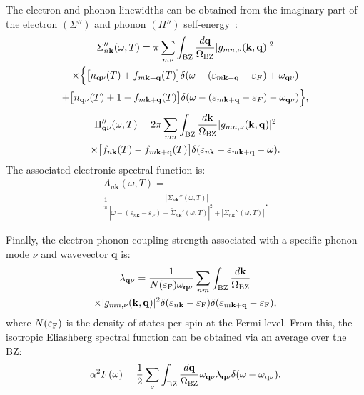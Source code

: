 \documentclass[final,3p,times,twocolumn]{elsarticle}
\begin{document}
The electron and phonon linewidths can be obtained from the imaginary part of the electron $(\Sigma'')$ and phonon $(\Pi'')$ self-energy~\cite{Giustino2007}:
\begin{multline}\label{linewidthel}
   \Sigma_{n\mathbf{k}}''(\omega,T) = \pi \sum_{m\nu} \int_{\rm BZ} \frac{d\mathbf{q}}{\Omega_{\rm BZ}} | g_{mn,\nu}(\mathbf{k,q}) |^2 \\
    \times \Big\{\big[n_{\mathbf{q}\nu}(T)+f_{m\mathbf{k+q}}(T)\big]\delta(\omega - (\varepsilon_{m\mathbf{k+q}}-\varepsilon_F) +\omega_{\mathbf{q}\nu})\\
+ \big[n_{\mathbf{q}\nu}(T)+1-f_{m\mathbf{k+q}}(T)\big]\delta(\omega - (\varepsilon_{m\mathbf{k+q}}-\varepsilon_F) - \omega_{\mathbf{q}\nu})\Big\}, 
\end{multline}                                        
\begin{multline}\label{linewidthph}
\Pi_{\mathbf{q}\nu}''(\omega,T) = 2\pi \sum_{mn} \int_{\rm BZ} \frac{d\mathbf{k}}{\Omega_{\rm BZ}} | g_{mn,\nu}(\mathbf{k,q}) |^2 \\
\times \big[f_{n\mathbf{k}}(T)-f_{m\mathbf{k+q}}(T)\big]\delta(\varepsilon_{n\mathbf{k}} - \varepsilon_{m\mathbf{k+q}} -\omega).
\end{multline}         
The associated electronic spectral function is:  
\begin{multline}\label{spectral_funct}
   A_{n\mathbf{k}}(\omega,T) =\\
    \frac{1}{\pi} \frac{| \Sigma_{n\mathbf{k}}''(\omega,T)|}{|\omega - (\varepsilon_{n\mathbf{k}}-\varepsilon_F)- \tilde{\Sigma}_{n\mathbf{k}}'(\omega,T)|^2 + | \Sigma_{n\mathbf{k}}''(\omega,T)|}.
\end{multline}
       
Finally, the electron-phonon coupling strength associated with a specific phonon mode $\nu$ and wavevector $\mathbf{q}$ is:
\begin{multline}\label{lambdaEQ}
\lambda_{\mathbf{q}\nu} = \frac{1}{N(\varepsilon_{\rm F}) \omega_{\mathbf{q}\nu}} 
\sum_{nm} \int_{\rm BZ} \frac{d\mathbf{k}}{\Omega_{\rm BZ}} \\
 \times |g_{mn,\nu}(\mathbf{k,q})|^2  \delta(\varepsilon_{n\mathbf{k}}-\varepsilon_{\rm F}) \delta(\varepsilon_{m\mathbf{k+q}}-\varepsilon_{\rm F}),
\end{multline}
where $N(\varepsilon_{\rm F})$ is the density of states per spin at the Fermi level.
From this, the isotropic Eliashberg spectral function can be obtained via an average over the BZ:
\begin{equation}\label{isotropiceliash}
\alpha^2 F(\omega) = \frac{1}{2} \sum_\nu \int_{\rm BZ} \frac{d\mathbf{q}}{\Omega_{\rm BZ}} \omega_{\mathbf{q}\nu} \lambda_{\mathbf{q}\nu} \delta(\omega-\omega_{\mathbf{q}\nu}).
\end{equation}
\end{document}
